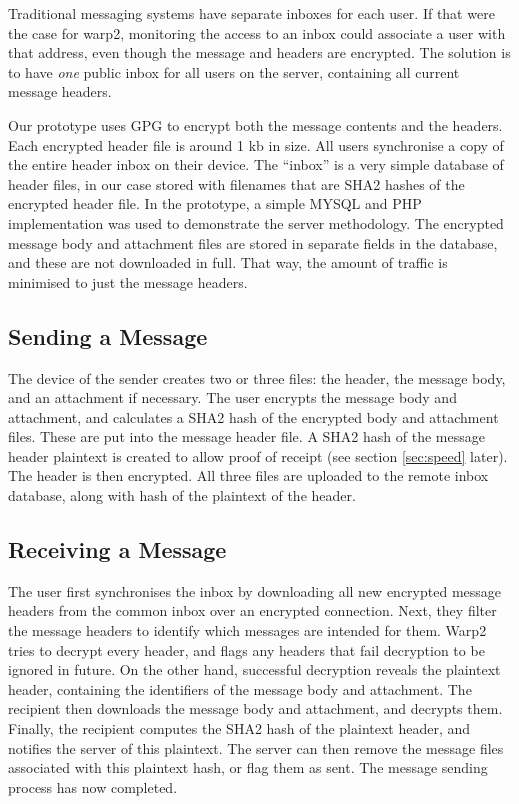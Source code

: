 \pdfoutput=1 \documentclass{article}
\begin{document}
Traditional messaging systems have separate inboxes for each user.  If that were the case for warp2, monitoring the access to an inbox could associate a user with that address, even though the message and headers are encrypted.  The solution is to have \emph{one} public inbox for all users on the server, containing all current message headers.

Our prototype uses GPG to encrypt both the message contents and the headers.  Each encrypted header file is around 1 kb in size.  All users synchronise a copy of the entire header inbox on their device.  The ``inbox'' is a very simple database of header files, in our case stored with filenames that are SHA2 hashes of the encrypted header file.  In the prototype, a simple MYSQL and PHP implementation was used to demonstrate the server methodology.  The encrypted message body and attachment files are stored in separate fields in the database, and these are not downloaded in full.  That way, the amount of traffic is minimised to just the message headers.

\subsection{Sending a Message}
The device of the sender creates two or three files: the header, the message body, and an attachment if necessary.  The user encrypts the message body and attachment, and calculates a SHA2 hash of the encrypted body and attachment files.  These are put into the message header file.   A SHA2 hash of the message header plaintext is created to allow proof of receipt (see section \ref{sec:speed} later).  The header is then encrypted.  All three files are uploaded to the remote inbox database, along with hash of the plaintext of the header.  

\subsection{Receiving a Message}
The user first synchronises the inbox by downloading all new encrypted message headers from the common inbox over an encrypted connection.  Next, they filter the message headers to identify which messages are intended for them.  Warp2 tries to decrypt every header, and flags any headers that fail decryption to be ignored in future.  On the other hand, successful decryption reveals the plaintext header, containing the identifiers of the message body and attachment.  The recipient then downloads the message body and attachment, and decrypts them.  Finally, the recipient computes the SHA2 hash of the plaintext header, and notifies the server of this plaintext.  The server can then remove the message files associated with this plaintext hash, or flag them as sent.  The message sending process has now completed.
\end{document}
